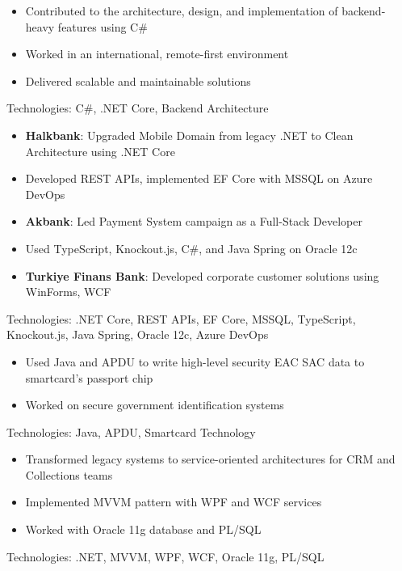 \documentclass[10pt,a4paper,ragged2e,withhyper]{altacv}
\begin{document}
\begin{paracol}{2}
\begin{itemize}
  \item Contributed to the architecture, design, and implementation of backend-heavy features using C\#
  \item Worked in an international, remote-first environment
  \item Delivered scalable and maintainable solutions
\end{itemize}
Technologies: C\#, .NET Core, Backend Architecture



\begin{itemize}
  \item \textbf{Halkbank}: Upgraded Mobile Domain from legacy .NET to Clean Architecture using .NET Core
  \item Developed REST APIs, implemented EF Core with MSSQL on Azure DevOps
  \item \textbf{Akbank}: Led Payment System campaign as a Full-Stack Developer
  \item Used TypeScript, Knockout.js, C\#, and Java Spring on Oracle 12c
  \item \textbf{Turkiye Finans Bank}: Developed corporate customer solutions using WinForms, WCF
\end{itemize}
Technologies: .NET Core, REST APIs, EF Core, MSSQL, TypeScript, Knockout.js, Java Spring, Oracle 12c, Azure DevOps



\begin{itemize}
  \item Used Java and APDU to write high-level security EAC SAC data to smartcard's passport chip
  \item Worked on secure government identification systems
\end{itemize}
Technologies: Java, APDU, Smartcard Technology



\begin{itemize}
  \item Transformed legacy systems to service-oriented architectures for CRM and Collections teams
  \item Implemented MVVM pattern with WPF and WCF services
  \item Worked with Oracle 11g database and PL/SQL
\end{itemize}
Technologies: .NET, MVVM, WPF, WCF, Oracle 11g, PL/SQL




\end{paracol}
\end{document}
